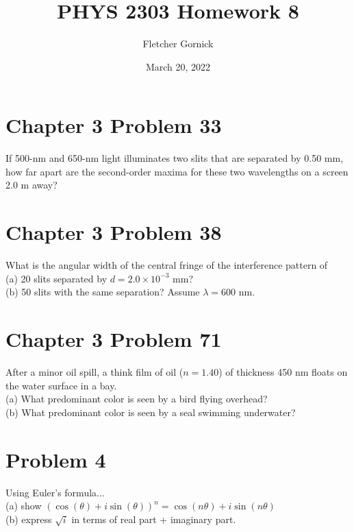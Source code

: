 \documentclass[11pt]{article}
\title{\vspace{-1.0cm}PHYS 2303 Homework 8}
\author{Fletcher Gornick}
\date{March 20, 2022}
\begin{document}
 \maketitle
 \section*{Chapter 3 Problem 33}
 If 500-nm and 650-nm light illuminates two slits that are separated by 0.50 mm, how far apart 
 are the second-order maxima for these two wavelengths on a screen 2.0 m away?
 \newpage

 \section*{Chapter 3 Problem 38}
 What is the angular width of the central fringe of the interference pattern of \\
 (a) 20 slits separated by \(d = 2.0 \times 10^{-3}\) mm? \\
 (b) 50 slits with the same separation?  Assume \(\lambda = 600\) nm.
 \newpage

 \section*{Chapter 3 Problem 71}
 After a minor oil spill, a think film of oil (\(n = 1.40\)) of thickness 450 nm floats on the 
 water surface in a bay. \\ 
 (a) What predominant color is seen by a bird flying overhead? \\ 
 (b) What predominant color is seen by a seal swimming underwater?
 \newpage

 \section*{Problem 4}
 Using Euler's formula... \\
 (a) show \((\cos(\theta) + i\sin(\theta))^n = \cos(n\theta) + i\sin(n\theta)\) \\
 (b) express \(\sqrt i\) in terms of real part + imaginary part.
\end{document}
